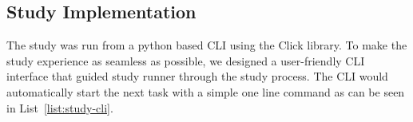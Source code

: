 \subsection{Study Implementation}

The study was run from a python based CLI using the Click \cite{noauthor_palletsclick_2024} library. To make the study experience as seamless as possible, we designed a user-friendly CLI interface that guided study runner through the study process. The CLI would automatically start the next task with a simple one line command as can be seen in List~\ref{list:study-cli}.

